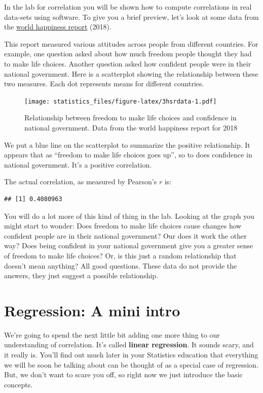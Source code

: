 \documentclass[]{book}
\begin{document}
In the lab for correlation you will be shown how to compute correlations in real data-sets using software. To give you a brief preview, let's look at some data from the \href{http://worldhappiness.report}{world happiness report} (2018).

This report measured various attitudes across people from different countries. For example, one question asked about how much freedom people thought they had to make life choices. Another question asked how confident people were in their national government. Here is a scatterplot showing the relationship between these two measures. Each dot represents means for different countries.

\begin{figure}
\centering
\texttt{[image: statistics\_files/figure-latex/3hsrdata-1.pdf]}
\caption{\label{fig:3hsrdata}Relationship between freedom to make life choices and confidence in national government. Data from the world happiness report for 2018}
\end{figure}

We put a blue line on the scatterplot to summarize the positive relationship. It appears that as ``freedom to make life choices goes up'', so to does confidence in national government. It's a positive correlation.

The actual correlation, as measured by Pearson's \(r\) is:

\begin{verbatim}
## [1] 0.4080963
\end{verbatim}

You will do a lot more of this kind of thing in the lab. Looking at the graph you might start to wonder: Does freedom to make life choices cause changes how confident people are in their national government? Our does it work the other way? Does being confident in your national government give you a greater sense of freedom to make life choices? Or, is this just a random relationship that doesn't mean anything? All good questions. These data do not provide the answers, they just suggest a possible relationship.

\hypertarget{regression-a-mini-intro}{%
\section{Regression: A mini intro}\label{regression-a-mini-intro}}

We're going to spend the next little bit adding one more thing to our understanding of correlation. It's called \textbf{linear regression}. It sounds scary, and it really is. You'll find out much later in your Statistics education that everything we will be soon be talking about can be thought of as a special case of regression. But, we don't want to scare you off, so right now we just introduce the basic concepts.
\end{document}
